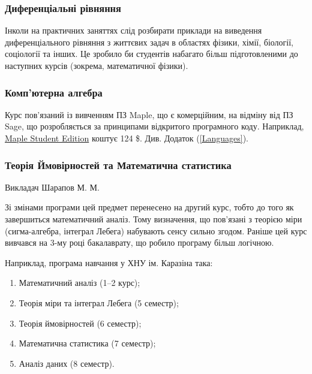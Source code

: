 \documentclass[14pt, a4paper]{extarticle}  %
\begin{document}
\subsubsection{Диференціальні рівняння}

Інколи на практичних заняттях слід розбирати приклади на виведення диференціального рівняння з життєвих задач в областях фізики, хімії, біології, соціології та інших. Це зробило би студентів набагато більш підготовленими до наступних курсів (зокрема, математичної фізики). 


\subsubsection{Комп'ютерна алгебра}

Курс пов'язаний із вивченням ПЗ Maple, що є комерційним, на відміну від ПЗ Sage, що розробляється за принципами відкритого програмного коду. Наприклад, \href{https://webstore.maplesoft.com/catalog.aspx}{Maple Student Edition} коштує 124 \$. Див. Додаток (\ref{Languages}). 

\subsubsection{Теорія Ймовірностей та Математична статистика}
Викладач Шарапов М. М. 

Зі змінами програми цей предмет перенесено на другий курс, тобто до того як завершиться математичний аналіз. Тому визначення, що пов'язані з теорією міри (сигма-алгебра, інтеграл Лебега) набувають сенсу сильно згодом. Раніше цей курс вивчався на 3-му році бакалаврату, що робило програму більш логічною. 

Наприклад, програма навчання у ХНУ ім. Каразіна така: 
\begin{enumerate}
    \item Математичний аналіз (1--2 курс);
    \item Теорія міри та інтеграл Лебега (5 семестр);
    \item Теорія ймовірностей (6 семестр);
    \item Математична статистика (7 семестр);
    \item Аналіз даних (8 семестр).
\end{enumerate}
\end{document}
